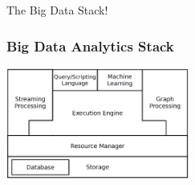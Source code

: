 \documentclass{beamer}
\begin{document}


\begin{frame}
\vspace{1cm}
\Huge{\centerline{The Big Data Stack!}}
\end{frame}

\begin{frame}
\frametitle{Big Data Analytics Stack}
\hspace*{3cm}\includegraphics[width=6cm]{figs/stack.pdf}
\end{frame}
\end{document}
